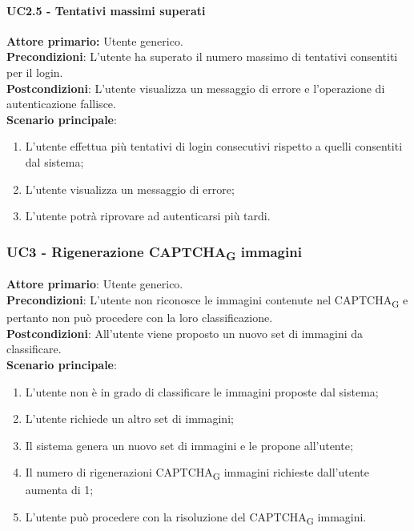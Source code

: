 \paragraph{UC2.5 - Tentativi massimi superati}
\textbf{Attore primario:} Utente generico.\\
\textbf{Precondizioni}: L'utente ha superato il numero massimo di tentativi consentiti per il login.\\
\textbf{Postcondizioni}: L’utente visualizza un messaggio di errore e l’operazione di autenticazione fallisce.\\

\textbf{Scenario principale}:
\begin{enumerate}
    \item L'utente effettua più tentativi di login consecutivi rispetto a quelli consentiti dal sistema;
	\item L’utente visualizza un messaggio di errore;
	\item L'utente potrà  riprovare ad autenticarsi più tardi.
\end{enumerate}

\subsubsection{UC3 - Rigenerazione CAPTCHA\textsubscript{G} immagini}
\textbf{Attore primario}: Utente generico.\\
\textbf{Precondizioni}: L'utente non riconosce le immagini contenute nel CAPTCHA\textsubscript{G} e pertanto non può procedere con la loro classificazione.\\
\textbf{Postcondizioni}: All'utente viene proposto un nuovo set di immagini da classificare.\\

\textbf{Scenario principale}:
\begin{enumerate}
   \item L'utente non è in grado di classificare le immagini proposte dal sistema;
   \item L'utente richiede un altro set di immagini;
   \item Il sistema genera un nuovo set di immagini e le propone all'utente;
   \item Il numero di rigenerazioni CAPTCHA\textsubscript{G} immagini richieste dall’utente aumenta di 1;
   \item L'utente può procedere con la risoluzione del CAPTCHA\textsubscript{G} immagini.
\end{enumerate}

